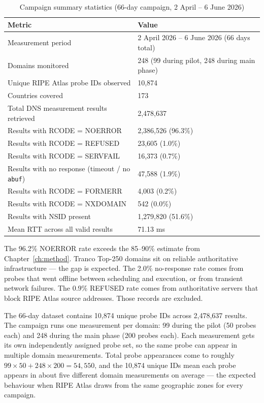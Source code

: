 \begin{table}[H]
\centering
\small
\begin{tabular}{l l}
\toprule
\textbf{Metric} & \textbf{Value} \\
\midrule
Measurement period & 2 April 2026 -- 6 June 2026 (66 days total) \\
Domains monitored & 248 (99 during pilot, 248 during main phase) \\
Unique RIPE Atlas probe IDs observed & 10,874 \\
Countries covered & 173 \\
Total \ac{DNS} measurement results retrieved & 2,478,637 \\
Results with RCODE = NOERROR & 2,386,526 (96.3\%) \\
Results with RCODE = REFUSED & 23,605 (1.0\%) \\
Results with RCODE = SERVFAIL & 16,373 (0.7\%) \\
Results with no response (timeout / no \texttt{abuf}) & 47,588 (1.9\%) \\
Results with RCODE = FORMERR & 4,003 (0.2\%) \\
Results with RCODE = NXDOMAIN & 542 (0.0\%) \\
Results with \ac{NSID} present & 1,279,820 (51.6\%) \\
Mean \ac{RTT} across all valid results & 71.13 ms \\
\bottomrule
\end{tabular}
\caption{Campaign summary statistics (66-day campaign, 2 April -- 6 June 2026)}
\label{tab:4.1}
\end{table}

The 96.2\% NOERROR rate exceeds the 85--90\% estimate from Chapter~\ref{ch:method}. Tranco Top-250 domains sit on reliable authoritative infrastructure --- the gap is expected. The 2.0\% no-response rate comes from probes that went offline between scheduling and execution, or from transient network failures. The 0.9\% REFUSED rate comes from authoritative servers that block RIPE Atlas source addresses. Those records are excluded.

The 66-day dataset contains 10,874 unique probe IDs across 2,478,637 results. The campaign runs one measurement per domain: 99 during the pilot (50 probes each) and 248 during the main phase (200 probes each). Each measurement gets its own independently assigned probe set, so the same probe can appear in multiple domain measurements. Total probe appearances come to roughly $99 \times 50 + 248 \times 200 = 54{,}550$, and the 10,874 unique IDs mean each probe appears in about five different domain measurements on average --- the expected behaviour when RIPE Atlas draws from the same geographic zones for every campaign.

